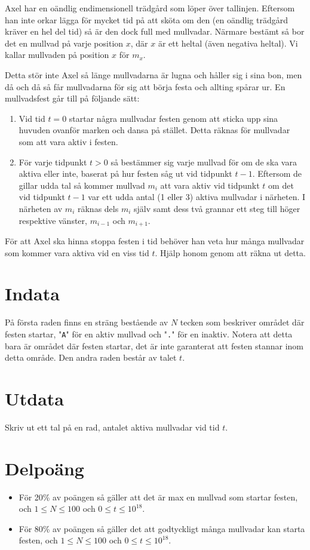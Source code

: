 
Axel har en oändlig endimensionell trädgård som löper över tallinjen. Eftersom han inte orkar lägga för mycket tid på att sköta om den (en oändlig trädgård kräver en hel del tid) så är den dock full med mullvadar. Närmare bestämt så bor det en mullvad på varje position $x$, där $x$ är ett heltal (även negativa heltal). Vi kallar mullvaden på position $x$ för $m_x$.

Detta stör inte Axel så länge mullvadarna är lugna och håller sig i sina bon, men då och då så får mullvadarna för sig att börja festa och allting spårar ur. En mullvadsfest går till på följande sätt:
\begin{enumerate}
\item Vid tid $t=0$ startar några mullvadar festen genom att sticka upp sina huvuden ovanför marken och dansa på stället. Detta räknas för mullvadar som att vara aktiv i festen.
\item För varje tidpunkt $t > 0$ så bestämmer sig varje mullvad för om de ska vara aktiva eller inte, baserat på hur festen såg ut vid tidpunkt $t-1$. Eftersom de gillar udda tal så kommer mullvad $m_i$ att vara aktiv vid tidpunkt $t$ om det vid tidpunkt $t-1$ var ett udda antal (1 eller 3) aktiva mullvadar i närheten. I närheten av $m_i$ räknas dels $m_i$ själv samt dess två grannar ett steg till höger respektive vänster, $m_{i-1}$ och $m_{i+1}$.
\end{enumerate}

För att Axel ska hinna stoppa festen i tid behöver han veta hur många mullvadar som kommer vara aktiva vid en viss tid $t$. Hjälp honom genom att räkna ut detta.

\section*{Indata}
På första raden finns en sträng bestående av $N$ tecken som beskriver området där festen startar, "\texttt{A}" för en aktiv mullvad och "\texttt{.}" för en inaktiv. Notera att detta bara är området där festen startar, det är inte garanterat att festen stannar inom detta område. Den andra raden består av talet $t$.

\section*{Utdata}
Skriv ut ett tal på en rad, antalet aktiva mullvadar vid tid $t$.

\section*{Delpoäng}
\begin{itemize}
\item För 20\% av poängen så gäller att det är max en mullvad som startar festen, och $1 \leq N \leq 100$ och $0 \leq t \leq 10^{18}$.
\item För 80\% av poängen så gäller det att godtyckligt många mullvadar kan starta festen, och $1 \leq N \leq 100$ och $0 \leq t \leq 10^{18}$.
\end{itemize}

